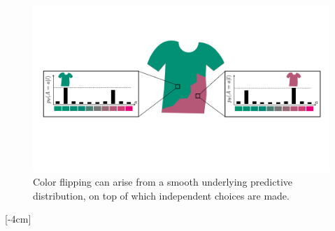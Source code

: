 \begin{figure}[t!]
    \centering
    \includegraphics[width=1.0\linewidth]{./figures/conditional_generative_models/cgen_tshirt_color_inconsistency.pdf}
    \caption{Color flipping can arise from a smooth underlying predictive distribution, on top of which independent choices are made.}
    \label{fig:conditional_generative_models:cgen_tshirt_color_inconsistency}
\end{figure}

[-4cm]


